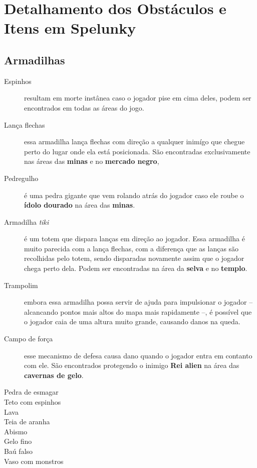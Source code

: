 \chapter{\label{appendix:spelunky-details}Detalhamento dos Obstáculos e
Itens em Spelunky}

\section{\label{section:spelunky-traps}Armadilhas}

\begin{description}
    \item[Espinhos]
        resultam em morte instânea caso o jogador pise em cima deles, podem ser
        encontrados em todas as áreas do jogo.
    \item[Lança flechas]
        essa armadilha lança flechas com direção a qualquer inimígo que chegue perto
        do lugar onde ela está posicionada. São encontradas exclusivamente nas
        áreas das \textbf{minas} e no \textbf{mercado negro}, 
    \item[Pedregulho]
        é uma pedra gigante que vem rolando atrás do jogador caso ele roube o
        \textbf{ídolo dourado} na área das \textbf{minas}.
    \item[Armadilha \textit{tiki}]
        é um totem que dispara lanças em direção ao jogador. Essa armadilha é
        muito parecida com a lança flechas, com a diferença que as lanças são
        recolhidas pelo totem, sendo disparadas novamente assim que o jogador
        chega perto dela. Podem ser encontradas na área da \textbf{selva} e no
        \textbf{templo}.
    \item[Trampolim]
        embora essa armadilha possa servir de ajuda para impulsionar o jogador
        -- alcancando pontos mais altos do mapa mais rapidamente --, é possível
        que o jogador caia de uma altura muito grande, causando danos na queda.
    \item[Campo de força]
        esse mecanismo de defesa causa dano quando o jogador entra em contanto
        com ele. São encontrados protegendo o inimigo \textbf{Rei alien} na
        área das \textbf{cavernas de gelo}.
    \item[Pedra de esmagar]
    \item[Teto com espinhos]
    \item[Lava]
    \item[Teia de aranha]
    \item[Abismo]
    \item[Gelo fino]
    \item[Baú falso]
    \item[Vaso com monstros]
\end{description}

